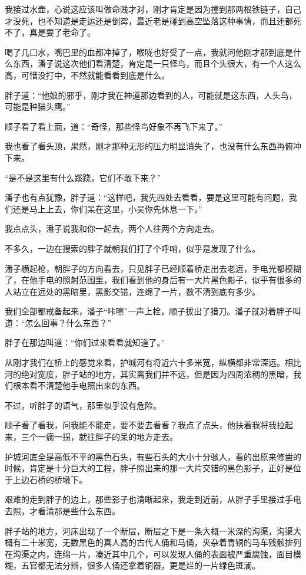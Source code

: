 我接过水壶，心说这应该叫做命贱才对，刚才肯定是因为撞到那两根铁链子，自己才没死，也不知道是走运还是倒霉，最近老是碰到高空坠落这种事情，而且还都死不了，真是要了老命了。

喝了几口水，嘴巴里的血都冲掉了，喉咙也好受了一点，我就问他刚才那到底是什么东西，潘子说这次他们看清楚，肯定是一只怪鸟，而且个头很大，有一个人这么高，可惜没打中，不然就能看看到底是什么。

胖子道：“他娘的邪乎，刚才我在神道那边看到的人，可能就是这东西，人头鸟，可能是种猫头鹰。”

顺子看了看上面，道：“奇怪，那些怪鸟好象不再飞下来了。”

我也看了看头顶，果然，刚才那种无形的压力明显消失了，也没有什么东西再俯冲下来。

“是不是这里有什么蹊跷，它们不敢下来？”

潘子也有点犹豫，胖子道：“这样吧，我先四处去看看，要是这里可能有问题，我们还是马上上去，你们呆在这里，小吴你先休息一下。”

我点点头，潘子说我和你一起去，两个人往两个方向走去。

不多久，一边在搜索的胖子就朝我们打了个呼哨，似乎是发现了什么。

潘子横起枪，朝胖子的方向看去，只见胖子已经顺着桥走出去老远，手电光都模糊了，在他手电的照射范围里，我们看到他的身后有一大片黑色影子，似乎有很多的人站立在远处的黑暗里，黑影交错，连绵了一片，数不清到底有多少。

我们全部都戒备起来，潘子“咔嚓”一声上栓，顺子拔出了猎刀。潘子就对着胖子叫道：“怎么回事？什么东西？”

胖子在那边叫道：“你们过来看看就知道了。”

从刚才我们在桥上的感觉来看，护城河有将近六十多米宽，纵横都非常深远。相比河的绝对宽度，胖子站的地方，其实离我们并不远，但是因为四周浓稠的黑暗，我们根本看不清楚他手电照出来的东西。

不过，听胖子的语气，那里似乎没有危险。

顺子看了看我，问我能不能走，要不要去看看？我点了点头，他扶着我将我拉起来，三个一瘸一拐，就往胖子的呆的地方走去。

护城河底全是高低不平的黑色石头，有些石头的大小十分骇人，看的出原来修凿的时候，肯定是十分巨大的工程，胖子照出来的那一大片交错的黑色影子，正好是位于上边石桥的桥墩下。

艰难的走到胖子的边上，那些影子也清晰起来，我走到近前，从胖子手里接过手电去照，才看清那是些什么东西。

胖子站的地方，河床出现了一个断层，断层之下是一条大概一米深的沟渠，沟渠大概有二十米宽，无数黑色的真人高的古代人俑和马俑，夹杂着青铜的马车残骸排列在沟渠之内，连绵一片，凑近其中几个，可以发现人俑的表面被严重腐蚀，面目模糊，五官都无法分辨，很多人俑还拿着铜器，更是烂的一片绿色斑澜。

